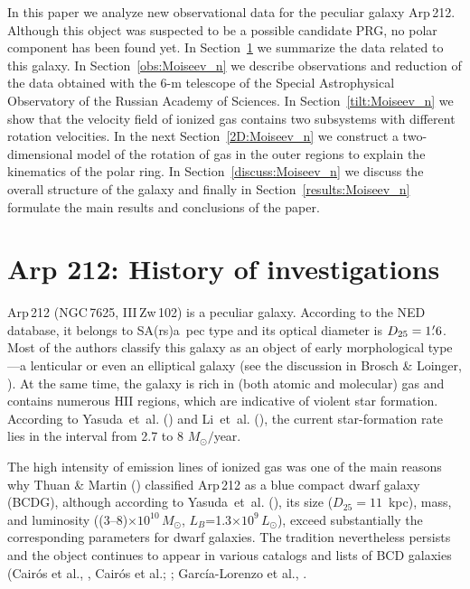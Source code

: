 \documentclass{ab}
\begin{document}
In this paper we analyze new observational data for the peculiar
galaxy Arp\,212. Although this object was suspected to be a
possible candidate PRG, no polar component has been found yet. In
Section~\ref{intro:Moiseev_n} we summarize the data related to
this galaxy. In Section~\ref{obs:Moiseev_n} we describe
observations and reduction of the data obtained with the 6-m
telescope of the Special Astrophysical Observatory of the Russian
Academy of Sciences. In Section~\ref{tilt:Moiseev_n} we show that
the velocity field of ionized gas contains two subsystems with
different rotation velocities. In the next
Section~\ref{2D:Moiseev_n} we construct a two-dimensional model of
the rotation of gas in the outer regions to explain the kinematics
of the polar ring. In Section~\ref{discuss:Moiseev_n} we discuss
the overall structure of the galaxy and finally in
Section~\ref{results:Moiseev_n} formulate the main results and
conclusions of the paper.

\section{Arp 212: History of investigations}

\label{intro:Moiseev_n}

Arp\,212 (NGC\,7625, III\,Zw\,102) is a peculiar galaxy. According
to the NED database, it belongs to SA(rs)a~pec type and its
optical diameter is \mbox{$D_{25}=1\hbox{$.\mkern-4mu^\prime$}6$}. Most of the authors
classify this galaxy as an object of early morphological type---a
lenticular or even an elliptical galaxy (see the discussion in
Brosch \& Loinger, \cite{br:Moiseev_n}). At the same time, the galaxy is rich in (both atomic and molecular) gas and contains numerous HII regions,
which are indicative of violent star formation. According to
Yasuda~et~al. (\cite{co:Moiseev_n}) and Li~et~al. (\cite{li:Moiseev_n}), the current star-formation rate lies in the interval from 2.7 to  8 $M_\odot/$year.

The high intensity of emission lines of ionized gas was one of the
main reasons why Thuan \& Martin (\cite{thuan:Moiseev_n})
classified Arp\,212 as a blue compact dwarf galaxy (BCDG),
although according to Yasuda~et~al. (\cite{co:Moiseev_n}), its size ($D_{25}=11$~kpc), mass, and luminosity ((3--8)$\times10^{10}\,M_\odot$,
$L_B$=1.3\mbox{$\times10^9\,L_\odot$),} exceed substantially the
corresponding parameters for dwarf galaxies. The tradition nevertheless persists and the object continues to appear in various catalogs and lists of  BCD galaxies (Cair\'{o}s et al., \cite{cairos1:Moiseev_n}, Cair\'{o}s et al.; \cite{cairos2:Moiseev_n}; Garc\'{i}a-Lorenzo et al.,  \cite{cairos3:Moiseev_n}.
\end{document}
